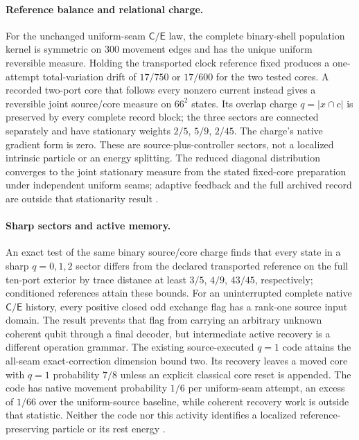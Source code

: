 \documentclass[11pt]{article}
\theoremstyle{definition}
\theoremstyle{remark}
\theoremstyle{plain}
\newcommand{\Cn}{\mathsf{C}}
\newcommand{\En}{\mathsf{E}}
\begin{document}
\paragraph{Reference balance and relational charge.}
For the unchanged uniform-seam $\Cn/\En$ law, the complete binary-shell
population kernel is symmetric on 300 movement edges and has the unique
uniform reversible measure. Holding the transported clock reference fixed
produces a one-attempt total-variation drift of $17/750$ or $17/600$ for
the two tested cores. A recorded two-port core that follows every nonzero
current instead gives a reversible joint source/core measure on $66^2$
states. Its overlap charge $q=|x\cap c|$ is preserved by every complete
record block; the three sectors are connected separately and have stationary
weights $2/5$, $5/9$, $2/45$. The charge's native gradient form is zero.
These are source-plus-controller sectors, not a localized intrinsic particle
or an energy splitting. The reduced diagonal distribution converges to the
joint stationary measure from the stated fixed-core preparation under
independent uniform seams; adaptive feedback and the full archived record
are outside that stationarity result \cite{finiteTheoremJoins}.

\paragraph{Sharp sectors and active memory.}
An exact test of the same binary source/core charge finds that every state
in a sharp $q=0,1,2$ sector differs from the declared transported reference
on the full ten-port exterior by trace distance at least $3/5$, $4/9$,
$43/45$, respectively; conditioned references attain these bounds. For an
uninterrupted complete native $\Cn/\En$ history, every positive closed odd
exchange flag has a rank-one source input domain. The result prevents that
flag from carrying an arbitrary unknown coherent qubit through a final
decoder, but intermediate active recovery is a different operation grammar.
The existing source-executed $q=1$ code attains the all-seam exact-correction
dimension bound two. Its recovery leaves a moved core with $q=1$ probability
$7/8$ unless an explicit classical core reset is appended. The code has
native movement probability $1/6$ per uniform-seam attempt, an excess of
$1/66$ over the uniform-source baseline, while coherent recovery work is
outside that statistic. Neither the code nor this activity identifies a
localized reference-preserving particle or its rest energy
\cite{exchangeSector}.
\end{document}
